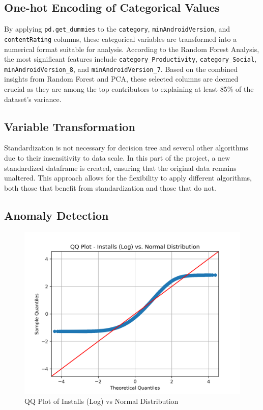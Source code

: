 \subsection{One-hot Encoding of Categorical Values}

By applying \texttt{pd.get\_dummies} to the \texttt{category}, \texttt{minAndroidVersion}, and \texttt{contentRating} columns, these categorical variables are transformed into a numerical format suitable for analysis. According to the Random Forest Analysis, the most significant features include \texttt{category\_Productivity}, \texttt{category\_Social}, \texttt{minAndroidVersion\_8}, and \texttt{minAndroidVersion\_7}. Based on the combined insights from Random Forest and PCA, these selected columns are deemed crucial as they are among the top contributors to explaining at least 85\% of the dataset's variance.

\subsection{Variable Transformation}

Standardization is not necessary for decision tree and several other algorithms due to their insensitivity to data scale. In this part of the project, a new standardized dataframe is created, ensuring that the original data remains unaltered. This approach allows for the flexibility to apply different algorithms, both those that benefit from standardization and those that do not.

\subsection{Anomaly Detection}

\begin{figure}
    \centering
    \includegraphics[width=1\linewidth]{docs//assets/qqplot.png}
    \caption{QQ Plot of Installs (Log) vs Normal Distribution}
    \label{fig:qqplot}
\end{figure}

